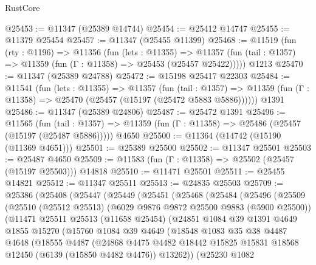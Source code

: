 \begin{lexlean}{RustCore}
\begin{coremodule}
@25453 := @11347 (@25389 @14744)
@25454 := @25412 @14747
@25455 := @11379 @25454
@25457 := @11347 (@25455 @11399)
@25468 := @11519
    (fun (rty : @1196) =>
    @11356
      (fun (lets : @11355) =>
      @11357 (fun (tail : @1357) => @11359 (fun (Γ : @11358) => @25453 (@25457 @25422)))))
    @1213
@25470 := @11347 (@25389 @24788)
@25472 := @15198 @25417 @22303
@25484 := @11541
    (fun (lets : @11355) =>
    @11357
      (fun (tail : @1357) =>
      @11359 (fun (Γ : @11358) => @25470 (@25457 (@15197 (@25472 @5883 @5886))))))
    @1391
@25486 := @11347 (@25389 @24806)
@25487 := @25472 @1391
@25496 := @11565
    (fun (tail : @1357) => @11359 (fun (Γ : @11358) => @25486 (@25457 (@15197 (@25487 @5886)))))
    @4650
@25500 := @11364 (@14742 (@15190 (@11369 @4651)))
@25501 := @25389 @25500
@25502 := @11347 @25501
@25503 := @25487 @4650
@25509 := @11583 (fun (Γ : @11358) => @25502 (@25457 (@15197 @25503))) @14818
@25510 := @11471 @25501
@25511 := @25455 @14821
@25512 := @11347 @25511
@25513 := @24835 @25503
@25709 := @25386
    (@25408
      (@25447
        (@25449
          (@25451
            (@25468
              (@25484
                (@25496
                  (@25509
                    (@25510
                      (@25512 @25513)
                      (@6029 @9876 @9872 @25500 @9883 (@5900 @25500))
                      (@11471
                        @25511
                        @25513
                        (@11658 @25454)
                        (@24851
                          @1084
                          @39
                          @1391
                          @4649
                          @1855
                          @15270
                          (@15760
                            @1084
                            @39
                            @4649
                            (@18548
                              @1083
                              @35
                              @38
                              @4487
                              @4648
                              (@18555
                                @4487
                                (@24868
                                  @4475
                                  @4482
                                  @18442
                                  @15825
                                  @15831
                                  @18568
                                  @12450
                                  (@6139 (@15850 @4482 @4476))
                                  @13262))
                              (@25230
                                @1082

\end{coremodule}
\end{lexlean}
